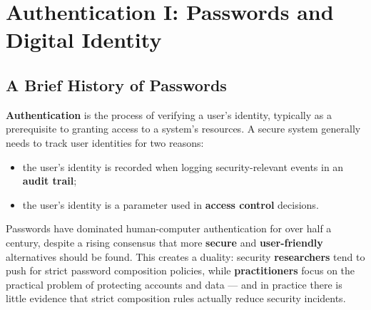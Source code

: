 \documentclass[12pt, a4paper]{article}
\newcounter{esercizio}[section]
\begin{document}
\renewcommand{\theesercizio}{\thesection.\arabic{esercizio}}

\section{Authentication I: Passwords and Digital Identity}

\subsection{A Brief History of Passwords}

\textbf{Authentication} is the process of verifying a user's identity, typically as a prerequisite to granting access to a system's resources. A secure system generally needs to track user identities for two reasons:
\begin{itemize}
    \item the user's identity is recorded when logging security-relevant events in an \textbf{audit trail};
    \item the user's identity is a parameter used in \textbf{access control} decisions.
\end{itemize}

Passwords have dominated human-computer authentication for over half a century, despite a rising consensus that more \textbf{secure} and \textbf{user-friendly} alternatives should be found. This creates a duality: security \textbf{researchers} tend to push for strict password composition policies, while \textbf{practitioners} focus on the practical problem of protecting accounts and data — and in practice there is little evidence that strict composition rules actually reduce security incidents.
\end{document}

